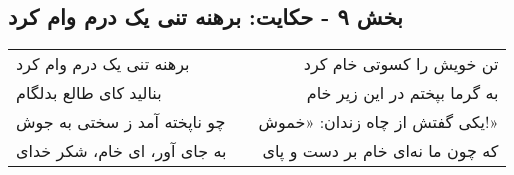\begin{center}
\section*{بخش ۹ - حکایت: برهنه تنی یک درم وام کرد}
\label{sec:009}
\begin{longtable}{l p{0.5cm} r}
برهنه تنی یک درم وام کرد
&&
تن خویش را کسوتی خام کرد
\\
بنالید کای طالع بدلگام
&&
به گرما بپختم در این زیر خام
\\
چو ناپخته آمد ز سختی به جوش
&&
یکی گفتش از چاه زندان: «خموش!»
\\
به جای آور، ای خام، شکر خدای
&&
که چون ما نه‌ای خام بر دست و پای
\\
\end{longtable}
\end{center}
